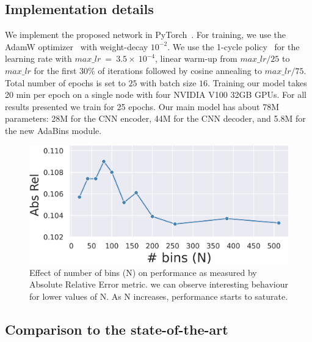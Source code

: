\documentclass[final]{cvpr}
\begin{document}
\subsection{Implementation details}
We implement the proposed network in PyTorch~\cite{NEURIPS2019_bdbca288}. For training, we use the AdamW optimizer~\cite{Loshchilov2019DecoupledWD} with weight-decay $10^{-2}$. We use the 1-cycle policy~\cite{DBLP:journals/corr/abs-1708-07120} for the learning rate with $max\_lr~=~3.5\times~10^{-4}$, linear warm-up from $max\_lr/25$ to $max\_lr$ for the first $30\%$ of iterations followed by cosine annealing to $max\_lr/75$. Total number of epochs is set to $25$ with batch size $16$. Training our model takes 20 min per epoch on a single node with four NVIDIA V100 32GB GPUs. For all results presented we train for 25 epochs. 
%
Our main model has about 78M parameters: 28M for the CNN encoder, 44M for the CNN decoder, and 5.8M for the new AdaBins module.

\begin{figure}[t]
    \centering
    \includegraphics[width=0.7\linewidth]{ablation_N-v4.png}
    \caption{Effect of number of bins (N) on performance as measured by Absolute Relative Error metric. we can observe interesting behaviour for lower values of N. As N increases, performance starts to saturate.}
    \label{fig:ablation-N}
\end{figure}

\subsection{Comparison to the state-of-the-art}
\end{document}
